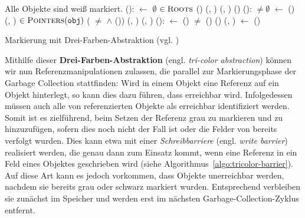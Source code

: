 \begin{algorithm}[h]
\begin{algorithmic}[1]
	\Pre Alle Objekte sind weiß markiert.
	\State {}():
	\State \quad {} $\gets$ $\emptyset$				
	\State \quad \FOREACH {} $\in \textsc{Roots}$
	\State \quad \quad \IF {}()
	\State \quad \quad \quad {}(, )	
	\State \quad \quad \quad {}(, )	
	\State \quad \quad \quad {}()
	\Statex
	\State {}():
	\State \quad \WHILE {} $\neq \emptyset$
	\State \quad \quad {} $\gets$ ()
	\State \quad \quad {}(, )		
	\State \quad \quad \FOREACH {} $\in \textsc{Pointers}(\texttt{obj})$
	\State \quad \quad \quad \IF ( $\neq$ \Null $\wedge$ ())	
	\State \quad \quad \quad \quad {}(, )	
	\State \quad \quad \quad \quad {}(, )
	\Statex
	\State {}():
	\State \quad {} $\gets$ ()
	\State \quad \WHILE {} $\neq$ \Null
	\State \quad \quad \IF {}()
	\State \quad \quad \quad {}()
	\State \quad \quad \ELSE {}(, )
	\State \quad \quad {} $\gets$ ()
\end{algorithmic}
\caption[Markierung mit Drei-Farben-Abstraktion]{Markierung mit Drei-Farben-Abstraktion (vgl. \cite[S. 970]{dijkstra1978})}
\label{algo:tricolor}
\end{algorithm}

Mithilfe dieser \textbf{Drei-Farben-Abstraktion} (engl. \textit{tri-color abstraction}) können wir nun Referenzmanipulationen zulassen, die parallel zur Markierungsphase der Garbage Collection stattfinden:
Wird in einem Objekt  eine Referenz auf ein Objekt  hinterlegt, so kann dies dazu führen, dass  erreichbar wird.
Infolgedessen müssen auch alle von  referenzierten Objekte als erreichbar identifiziert werden.
Somit ist es zielführend,  beim Setzen der Referenz grau zu markieren und zu  hinzuzufügen, sofern dies noch nicht der Fall ist oder die Felder von  bereits verfolgt wurden.
Dies kann etwa mit einer \textit{Schreibbarriere} (engl. \textit{write barrier}) realisiert werden, die genau dann zum Einsatz kommt, wenn eine Referenz in ein Feld eines Objektes geschrieben wird (siehe Algorithmus~\ref{algo:tricolor-barrier}).
Auf diese Art kann es jedoch vorkommen, dass Objekte unerreichbar werden, nachdem sie bereits grau oder schwarz markiert wurden.
Entsprechend verbleiben sie zunächst im Speicher und werden erst im nächsten Garbage-Collection-Zyklus entfernt.

